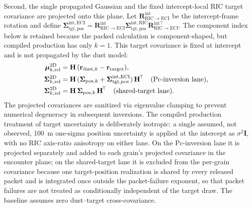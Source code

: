     Second, the single propagated Gaussian and the fixed intercept-local RIC target covariance are projected onto this plane. Let \(\mathbf{R}_{\mathrm{RIC}\rightarrow\mathrm{ECI}}^{\mathrm{int}}\) be the intercept-frame rotation and define \(\boldsymbol{\Sigma}_{\mathrm{tgt,pos}}^{\mathrm{int,ECI}}=\mathbf{R}_{\mathrm{RIC}\rightarrow\mathrm{ECI}}^{\mathrm{int}}\boldsymbol{\Sigma}_{\mathrm{tgt,pos}}^{\mathrm{int,RIC}}\mathbf{R}_{\mathrm{RIC}\rightarrow\mathrm{ECI}}^{\mathrm{int}\top}\). The component index below is retained because the packed calculation is component-shaped, but compiled production has only \(k=1\). This target covariance is fixed at intercept and is not propagated by the dust model:
    \begin{align}
        \boldsymbol{\mu}_{k,\mathrm{rel}}^{2\mathrm{D}} &= \mathbf{H}\,(\mathbf{r}_{\mathrm{dust},k} - \mathbf{r}_{\mathrm{target}}), \notag\\
        \boldsymbol{\Sigma}_{k,\mathrm{rel}}^{2\mathrm{D}} &=
        \mathbf{H}\,(\boldsymbol{\Sigma}_{\mathrm{pos},k}+\boldsymbol{\Sigma}_{\mathrm{tgt,pos}}^{\mathrm{int,ECI}})\,\mathbf{H}^{\!\top}
        \quad\text{(Pc-inversion lane)}, \notag\\
        \boldsymbol{\Sigma}_{k,\mathrm{rel}}^{2\mathrm{D}} &= \mathbf{H}\,\boldsymbol{\Sigma}_{\mathrm{pos},k}\,\mathbf{H}^{\!\top}
        \quad\text{(shared-target lane)}.
        \label{eq:bplane_projection}
    \end{align}
    The projected covariances are sanitized via eigenvalue clamping to prevent numerical degeneracy in subsequent inversions. The compiled production treatment of target uncertainty is deliberately isotropic: a single assumed, not observed, \SI{100}{\metre} one-sigma position uncertainty is applied at the intercept as \(\sigma^2\mathbf{I}\), with no RIC axis-ratio anisotropy on either lane. On the Pc-inversion lane it is projected separately and added to each grain's projected covariance in the encounter plane; on the shared-target lane it is excluded from the per-grain covariance because one target-position realization is shared by every released packet and is integrated once outside the packet-failure exponent, so that packet failures are not treated as conditionally independent of the target draw. The baseline assumes zero dust--target cross-covariance.

